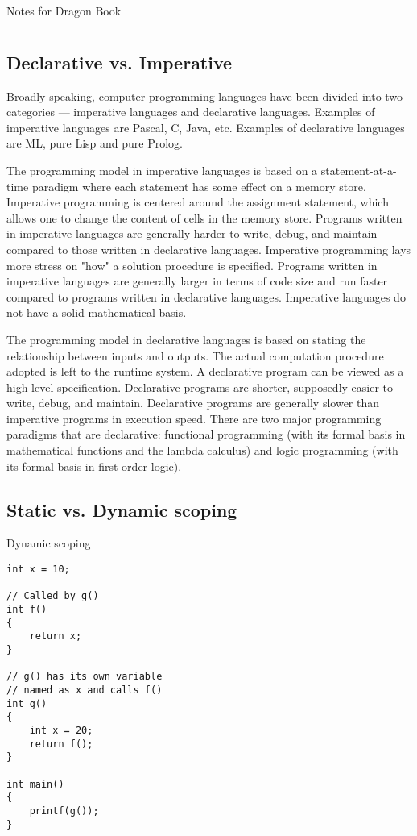 \documentclass[12pt,a4paper,oneside,draft]{report}
\begin{document}
\titleformat{\chapter}[display] %
{\normalfont\bfseries}{}{0pt}{\Large}

\begin{center}
	Notes for Dragon Book
\end{center}

\chapter{}
\section*{Declarative vs. Imperative}
Broadly speaking, computer programming languages have been divided into two categories — imperative languages and declarative languages.
Examples of imperative languages are Pascal, C, Java, etc. Examples of declarative languages are ML, pure Lisp and pure Prolog.
\par
The programming model in imperative languages is based on a statement-at-a-time paradigm where each statement has some effect on a memory store. Imperative programming is centered around the assignment statement, which allows one to change the content of cells in the memory store. Programs written in imperative languages are generally harder to write, debug, and maintain compared to those written in declarative languages. Imperative programming lays more stress on "how" a solution procedure is specified. Programs written in imperative languages are generally larger in terms of code size and run faster compared to programs written in declarative languages. Imperative languages do not have a solid mathematical basis.
\par
The programming model in declarative languages is based on stating the relationship between inputs and outputs. The actual computation procedure adopted is left to the runtime system. A declarative program can be viewed as a high level specification. Declarative programs are shorter, supposedly easier to write, debug, and maintain. Declarative programs are generally slower than imperative programs in execution speed.
There are two major programming paradigms that are declarative: functional programming (with its formal basis in mathematical functions and the lambda calculus) and logic programming (with its formal basis in first order logic).

\newpage

\section*{Static vs. Dynamic scoping}
Dynamic scoping
\lstset{style=myStyle}
\begin{lstlisting}
int x = 10;
 
// Called by g()
int f()
{
	return x;
}
 
// g() has its own variable
// named as x and calls f()
int g()
{
	int x = 20;
	return f();
}
 
int main()
{
	printf(g());
}
\end{lstlisting}
\end{document}

